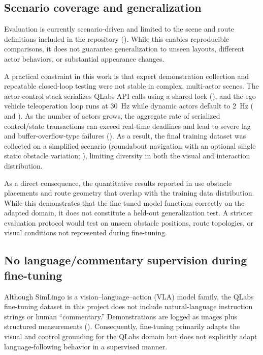 \subsection{Scenario coverage and generalization}
Evaluation is currently scenario-driven and limited to the scene and route definitions included in the repository (). While this enables reproducible comparisons, it does not guarantee generalization to unseen layouts, different actor behaviors, or substantial appearance changes.

A practical constraint in this work is that expert demonstration collection and repeatable closed-loop testing were not stable in complex, multi-actor scenes. The actor-control stack serializes QLabs API calls using a shared lock (), and the ego vehicle teleoperation loop runs at \SI{30}{Hz} while dynamic actors default to \SI{2}{Hz} ( and ). As the number of actors grows, the aggregate rate of serialized control/state transactions can exceed real-time deadlines and lead to severe lag and buffer-overflow-type failures (). As a result, the final training dataset was collected on a simplified scenario (roundabout navigation with an optional single static obstacle variation; ), limiting diversity in both the visual and interaction distribution.

As a direct consequence, the quantitative results reported in  use obstacle placements and route geometry that overlap with the training data distribution. While this demonstrates that the fine-tuned model functions correctly on the adapted domain, it does not constitute a held-out generalization test. A stricter evaluation protocol would test on unseen obstacle positions, route topologies, or visual conditions not represented during fine-tuning.

\subsection{No language/commentary supervision during fine-tuning}
Although SimLingo is a vision--language--action (VLA) model family, the QLabs fine-tuning dataset in this project does not include natural-language instruction strings or human ``commentary.'' Demonstrations are logged as images plus structured measurements (). Consequently, fine-tuning primarily adapts the visual and control grounding for the QLabs domain but does not explicitly adapt language-following behavior in a supervised manner.

